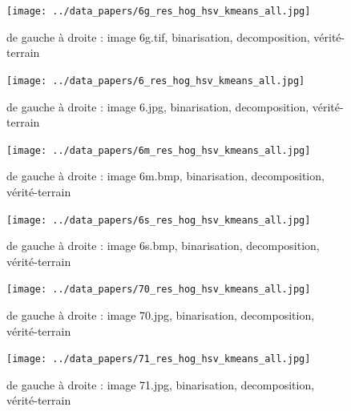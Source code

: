 \documentclass{book}
\begin{document}
\begin{figure}[H]
\begin{center}
\texttt{[image: ../data\_papers/6g\_res\_hog\_hsv\_kmeans\_all.jpg]}
\end{center}
\caption{de gauche à droite : image 6g.tif, binarisation, decomposition, vérité-terrain}
\label{6g}
\end{figure}
\clearpage


\begin{figure}[H]
\begin{center}
\texttt{[image: ../data\_papers/6\_res\_hog\_hsv\_kmeans\_all.jpg]}
\end{center}
\caption{de gauche à droite : image 6.jpg, binarisation, decomposition, vérité-terrain}
\label{6}
\end{figure}
\clearpage


\begin{figure}[H]
\begin{center}
\texttt{[image: ../data\_papers/6m\_res\_hog\_hsv\_kmeans\_all.jpg]}
\end{center}
\caption{de gauche à droite : image 6m.bmp, binarisation, decomposition, vérité-terrain}
\label{6m}
\end{figure}
\clearpage


\begin{figure}[H]
\begin{center}
\texttt{[image: ../data\_papers/6s\_res\_hog\_hsv\_kmeans\_all.jpg]}
\end{center}
\caption{de gauche à droite : image 6s.bmp, binarisation, decomposition, vérité-terrain}
\label{6s}
\end{figure}
\clearpage


\begin{figure}[H]
\begin{center}
\texttt{[image: ../data\_papers/70\_res\_hog\_hsv\_kmeans\_all.jpg]}
\end{center}
\caption{de gauche à droite : image 70.jpg, binarisation, decomposition, vérité-terrain}
\label{70}
\end{figure}
\clearpage


\begin{figure}[H]
\begin{center}
\texttt{[image: ../data\_papers/71\_res\_hog\_hsv\_kmeans\_all.jpg]}
\end{center}
\caption{de gauche à droite : image 71.jpg, binarisation, decomposition, vérité-terrain}
\label{71}
\end{figure}
\clearpage
\end{document}
